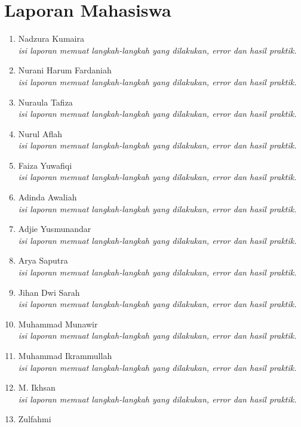 \documentclass[a4paper]{tufte-handout}
\begin{document}
\section{Laporan Mahasiswa}
\begin{enumerate}
\item Nadzura Kumaira		\\
\textit{isi laporan memuat langkah-langkah yang dilakukan, error dan hasil praktik.}
\item Nurani Harum Fardaniah\\
\textit{isi laporan memuat langkah-langkah yang dilakukan, error dan hasil praktik.}
\item Nuraula Tafiza		\\
\textit{isi laporan memuat langkah-langkah yang dilakukan, error dan hasil praktik.}
\item Nurul Aflah			\\
\textit{isi laporan memuat langkah-langkah yang dilakukan, error dan hasil praktik.}
\item Faiza Yuwafiqi		\\
\textit{isi laporan memuat langkah-langkah yang dilakukan, error dan hasil praktik.}
\item Adinda Awaliah		\\
\textit{isi laporan memuat langkah-langkah yang dilakukan, error dan hasil praktik.}
\item Adjie Yusmunandar		\\
\textit{isi laporan memuat langkah-langkah yang dilakukan, error dan hasil praktik.}
\item Arya Saputra			\\
\textit{isi laporan memuat langkah-langkah yang dilakukan, error dan hasil praktik.}
\item Jihan Dwi Sarah		\\
\textit{isi laporan memuat langkah-langkah yang dilakukan, error dan hasil praktik.}
\item Muhammad Munawir		\\
\textit{isi laporan memuat langkah-langkah yang dilakukan, error dan hasil praktik.}
\item Muhammad Ikrammullah	\\
\textit{isi laporan memuat langkah-langkah yang dilakukan, error dan hasil praktik.}
\item M. Ikhsan				\\
\textit{isi laporan memuat langkah-langkah yang dilakukan, error dan hasil praktik.}
\item Zulfahmi				\\

\end{enumerate}
\end{document}
